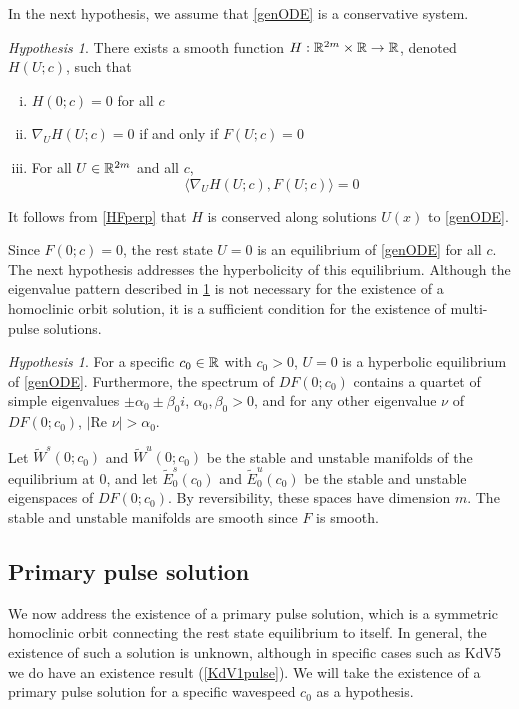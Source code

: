 \documentclass[11pt,reqno]{amsart}
\theoremstyle{plain}
\theoremstyle{definition}
\theoremstyle{remark}
\newtheorem{hypothesis}[theorem]{Hypothesis}
\begin{document}
In the next hypothesis, we assume that \cref{genODE} is a conservative system.
\begin{hypothesis}\label{Hhyp}
There exists a smooth function $H: \mathbb{R}^{2m} \times \mathbb{R} \rightarrow \mathbb{R}$, denoted $H(U; c)$, such that 
\begin{enumerate}[(i)]
\item $H(0; c) = 0$ for all $c$
\item $\nabla_U H(U; c) = 0$ if and only if $F(U; c) = 0$
\item For all $U \in \mathbb{R}^{2m}$ and all $c$,
\begin{equation}\label{HFperp}
\langle \nabla_U H(U; c), F(U; c) \rangle = 0
\end{equation}
\end{enumerate}
\end{hypothesis}

\noi It follows from \cref{HFperp} that $H$ is conserved along solutions $U(x)$ to \cref{genODE}. 

Since $F(0; c) = 0$, the rest state $U = 0$ is an equilibrium of \cref{genODE} for all $c$. The next hypothesis addresses the hyperbolicity of this equilibrium. Although the eigenvalue pattern described in \cref{hypeqhyp} is not necessary for the existence of a homoclinic orbit solution, it is a sufficient condition for the existence of multi-pulse solutions.

\begin{hypothesis}\label{hypeqhyp}
For a specific $c_0 \in \mathbb{R}$ with $c_0 > 0$, $U = 0$ is a hyperbolic equilibrium of \cref{genODE}. Furthermore, the spectrum of $DF(0; c_0)$ contains a quartet of simple eigenvalues $\pm \alpha_0 \pm \beta_0 i$, $\alpha_0, \beta_0 > 0$, and for any other eigenvalue $\nu$ of $DF(0; c_0)$, $|\text{Re }\nu| > \alpha_0$.
\end{hypothesis}

Let $\tilde{W}^s(0; c_0)$ and $\tilde{W}^u(0; c_0)$ be the stable and unstable manifolds of the equilibrium at 0, and let $\tilde{E}_0^s(c_0)$ and $\tilde{E}_0^u(c_0)$ be the stable and unstable eigenspaces of $DF(0; c_0)$. By reversibility, these spaces have dimension $m$. The stable and unstable manifolds are smooth since $F$ is smooth.

\subsection{Primary pulse solution}\label{sec:primarypulse}

We now address the existence of a primary pulse solution, which is a symmetric homoclinic orbit connecting the rest state equilibrium to itself. In general, the existence of such a solution is unknown, although in specific cases such as KdV5 we do have an existence result (\cref{KdV1pulse}). We will take the existence of a primary pulse solution for a specific wavespeed $c_0$ as a hypothesis.
\end{document}
